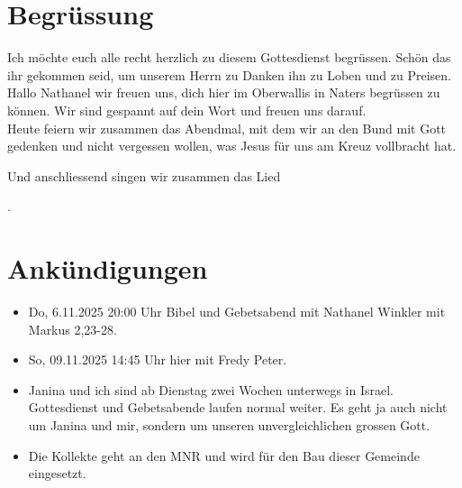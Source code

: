 \documentclass{../../inc/mybib}
\begin{document}
\section{Begrüssung}

Ich möchte euch alle recht herzlich zu diesem Gottesdienst begrüssen. Schön das ihr gekommen seid, um unserem Herrn zu Danken ihn zu Loben und zu Preisen.
Hallo Nathanel wir freuen uns, dich hier im Oberwallis in Naters begrüssen zu können. Wir sind gespannt auf dein Wort und freuen uns darauf.\\
Heute feiern wir zusammen das Abendmal, mit dem wir an den Bund mit Gott gedenken und nicht vergessen wollen, was Jesus für uns am Kreuz vollbracht hat.

\beten{} Und anschliessend singen wir zusammen das Lied

{}.

\section{Ankündigungen}
\begin{itemize}
    \item {} Do, 6.11.2025 20:00 Uhr Bibel und Gebetsabend mit Nathanel Winkler mit Markus 2,23-28.
    \item {} So, 09.11.2025 14:45 Uhr hier mit Fredy Peter.
    \item {} Janina und ich sind ab Dienstag zwei Wochen unterwegs in Israel. Gottesdienst und Gebetsabende laufen normal weiter. Es geht ja auch nicht um Janina und mir, sondern um unseren unvergleichlichen grossen Gott. 
    \item {} Die Kollekte geht an den MNR und wird für den Bau dieser Gemeinde eingesetzt.
\end{itemize}
\end{document}
